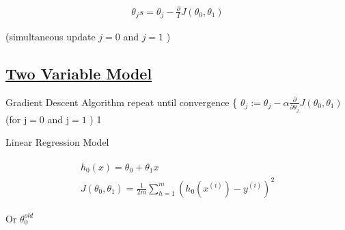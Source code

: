 \documentclass[12pt,a4paper]{article}
\begin{document}
\begin{align*}
\theta_j s=\theta_j-\frac{\partial}{I} J\left(\theta_0, \theta_1\right)
\end{align*}

(simultaneous update
\(j=0\) and \(j=1\) )

 \subsection*{  \underline{ Two Variable Model }  } 
 Gradient Descent Algorithm
repeat until convergence \{
\(\theta_j:=\theta_j-\alpha \frac{\partial}{\partial \theta_j} J\left(\theta_0, \theta_1\right)\)
(for \(\mathrm{j}=0\) and \(\mathrm{j}=1\) ) 1

Linear Regression Model

\begin{align*}
\begin{gathered}
h_0(x)=\theta_0+\theta_1 x \\
J\left(\theta_0, \theta_1\right)=\frac{1}{2 m} \sum_{h=1}^m\left(h_0\left(x^{(i)}\right)-y^{(i)}\right)^2
\end{gathered}
\end{align*}

Or 
\(\theta_{0}^{old}\)  
\end{document}
